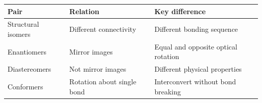 \documentclass[12pt,a4paper]{article}
\begin{document}
\begin{tcolorbox}[tikzbox, title={Summary Reference Table}]
\begin{tabularx}{\linewidth}{|B{3cm}|Y|Y|}
\hline
\textbf{Pair} & \textbf{Relation} & \textbf{Key difference} \\
\hline
Structural isomers & Different connectivity & Different bonding sequence \\
\hline
Enantiomers & Mirror images & Equal and opposite optical rotation \\
\hline
Diastereomers & Not mirror images & Different physical properties \\
\hline
Conformers & Rotation about single bond & Interconvert without bond breaking \\
\hline
\end{tabularx}
\end{tcolorbox}
\end{document}
